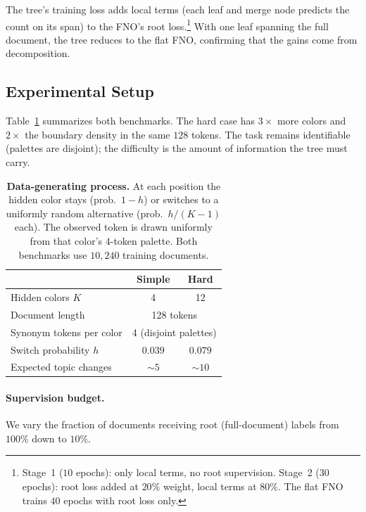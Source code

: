The tree's training loss adds local terms (each leaf and merge node predicts the count on its span) to the FNO's root loss.\footnote{Stage~1 ($10$ epochs): only local terms, no root supervision. Stage~2 ($30$ epochs): root loss added at $20\%$ weight, local terms at $80\%$. The flat FNO trains $40$ epochs with root loss only.} With one leaf spanning the full document, the tree reduces to the flat FNO, confirming that the gains come from decomposition.

\subsection{Experimental Setup}\label{sec:experiment-setup}

Table~\ref{tab:dgp} summarizes both benchmarks. The hard case has $3{\times}$ more colors and $2{\times}$ the boundary density in the same $128$ tokens. The task remains identifiable (palettes are disjoint); the difficulty is the amount of information the tree must carry.

\begin{table}[htbp]
    \centering
    \small
    \begin{tabular}{lcc}
        \toprule
        & \textbf{Simple} & \textbf{Hard} \\
        \midrule
        Hidden colors $K$ & 4 & 12 \\
        Document length & \multicolumn{2}{c}{128 tokens} \\
        Synonym tokens per color & \multicolumn{2}{c}{4 (disjoint palettes)} \\
        \midrule
        Switch probability $h$ & $0.039$ & $0.079$ \\
        Expected topic changes & ${\sim}5$ & ${\sim}10$ \\
        \bottomrule
    \end{tabular}
    \caption{\textbf{Data-generating process.}
    At each position the hidden color stays (prob.\ $1{-}h$) or switches to a uniformly random alternative (prob.\ $h/(K{-}1)$ each). The observed token is drawn uniformly from that color's $4$-token palette. Both benchmarks use $10{,}240$ training documents.}
    \label{tab:dgp}
\end{table}

\paragraph{Supervision budget.}
We vary the fraction of documents receiving root (full-document) labels from $100\%$ down to $10\%$.


